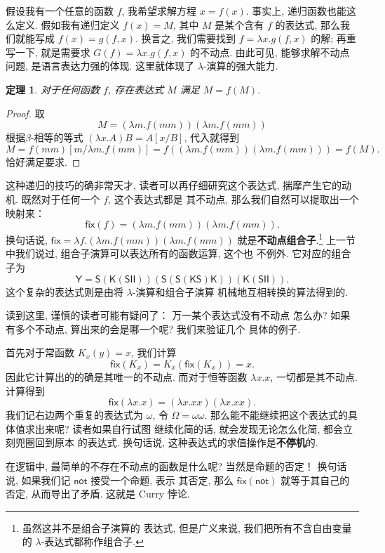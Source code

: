 \documentclass[UTF8]{ctexbook}
\newcommand{\cons}[1]{\textsf{#1}}
\theoremstyle{plain}
\newtheorem{theorem}{定理}[chapter]
\theoremstyle{definition}
\theoremstyle{remark}
\begin{document}
假设我有一个任意的函数 \(f\), 我希望求解方程 \(x = f(x)\).
事实上, 递归函数也能这么定义. 假如我有递归定义 \(f(x) = M\),
其中 \(M\) 是某个含有 \(f\) 的表达式, 那么我们就能写成
\(f(x) = g(f,x)\). 换言之, 我们需要找到 \(f = \lambda x. g(f,x)\)
的解; 再重写一下, 就是需要求 \(G(f) = \lambda x. g(f,x)\)
的不动点. 由此可见, 能够求解不动点问题, 是语言表达力强的体现.
这里就体现了 \(\lambda\)-演算的强大能力.

\begin{theorem}
对于任何函数 \(f\),
存在表达式 \(M\) 满足 \(M=f(M)\).
\end{theorem}
\begin{proof}
取
\[M = (\lambda m. f(mm))(\lambda m. f(mm))\]
根据\(\beta\)-相等的等式 \((\lambda x. A)B = A[x/B]\),
代入就得到
\[M = f(mm)[m/\lambda m.f(mm)]
= f((\lambda m. f(mm))(\lambda m.f(mm)))
= f(M).\]
恰好满足要求.
\end{proof}
这种递归的技巧的确非常天才, 读者可以再仔细研究这个表达式,
揣摩产生它的动机. 既然对于任何一个 \(f\), 这个表达式都是
其不动点, 那么我们自然可以提取出一个映射来：
\[\cons{fix}(f) = (\lambda m. f(mm)) (\lambda m. f(mm)).\]
换句话说, \(\cons{fix} = \lambda f. (\lambda m. f(mm)) (\lambda m. f(mm))\)
就是\textbf{不动点组合子}.\footnote{虽然这并不是组合子演算的
表达式, 但是广义来说, 我们把所有不含自由变量
的 \(\lambda\)-表达式都称作组合子.}
上一节中我们说过, 组合子演算可以表达所有的函数运算, 这个也
不例外. 它对应的组合子为
\[\cons{Y} = \cons{S}(\cons{K}(\cons{S}\cons{I}\cons{I}))
(\cons{S}(\cons{S}(\cons{K}\cons{S})\cons{K}))
(\cons{K}(\cons{S}\cons{I}\cons{I})).\]
这个复杂的表达式则是由将 \(\lambda\)-演算和组合子演算
机械地互相转换的算法得到的.

读到这里, 谨慎的读者可能有疑问了： 万一某个表达式没有不动点
怎么办? 如果有多个不动点, 算出来的会是哪一个呢? 我们来验证几个
具体的例子.

首先对于常函数 \(K_x(y) = x\), 我们计算
\[\cons{fix}(K_x) = K_x(\cons{fix}(K_x)) = x.\]
因此它计算出的的确是其唯一的不动点. 而对于恒等函数
\(\lambda x. x\), 一切都是其不动点. 计算得到
\[\cons{fix}(\lambda x.x) = (\lambda x.xx)(\lambda x.xx).\]
我们记右边两个重复的表达式为 \(\omega\), 令 \(\Omega = \omega\omega\).
那么能不能继续把这个表达式的具体值求出来呢? 读者如果自行试图
继续化简的话, 就会发现无论怎么化简, 都会立刻兜圈回到原本
的表达式. 换句话说, 这种表达式的求值操作是\textbf{不停机}的.

在逻辑中, 最简单的不存在不动点的函数是什么呢? 当然是命题的否定！
换句话说, 如果我们记 \(\cons{not}\) 接受一个命题, 表示
其否定, 那么 \(\cons{fix}(\cons{not})\) 就等于其自己的否定,
从而导出了矛盾. 这就是 Curry 悖论.
\end{document}
